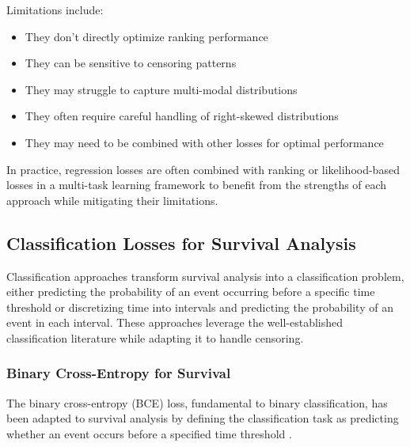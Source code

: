 Limitations include:
\begin{itemize}
\item They don't directly optimize ranking performance
\item They can be sensitive to censoring patterns
\item They may struggle to capture multi-modal distributions
\item They often require careful handling of right-skewed distributions
\item They may need to be combined with other losses for optimal performance
\end{itemize}

In practice, regression losses are often combined with ranking or likelihood-based losses in a multi-task learning framework to benefit from the strengths of each approach while mitigating their limitations.

\subsection{Classification Losses for Survival Analysis}

Classification approaches transform survival analysis into a classification problem, either predicting the probability of an event occurring before a specific time threshold or discretizing time into intervals and predicting the probability of an event in each interval. These approaches leverage the well-established classification literature while adapting it to handle censoring.

\subsubsection{Binary Cross-Entropy for Survival}

The binary cross-entropy (BCE) loss, fundamental to binary classification, has been adapted to survival analysis by defining the classification task as predicting whether an event occurs before a specified time threshold \parencite{graf1999}.


